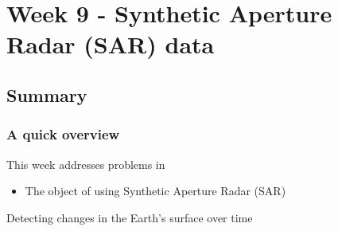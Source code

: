 \documentclass[
  letterpaper,
  DIV=11,
  numbers=noendperiod]{scrreprt}
\providecommand{\tightlist}{%
  \setlength{\itemsep}{0pt}\setlength{\parskip}{0pt}}\usepackage{longtable,booktabs,array}
\begin{document}

\hypertarget{week-9---synthetic-aperture-radar-sar-data}{%
\chapter{Week 9 - Synthetic Aperture Radar (SAR)
data}\label{week-9---synthetic-aperture-radar-sar-data}}

\hypertarget{summary-7}{%
\section{Summary}\label{summary-7}}

\hypertarget{a-quick-overview}{%
\subsection{A quick overview}\label{a-quick-overview}}

This week addresses problems in

\begin{itemize}
\tightlist
\item
  The object of using Synthetic Aperture Radar (SAR)
\end{itemize}

Detecting changes in the Earth's surface over time
\end{document}
